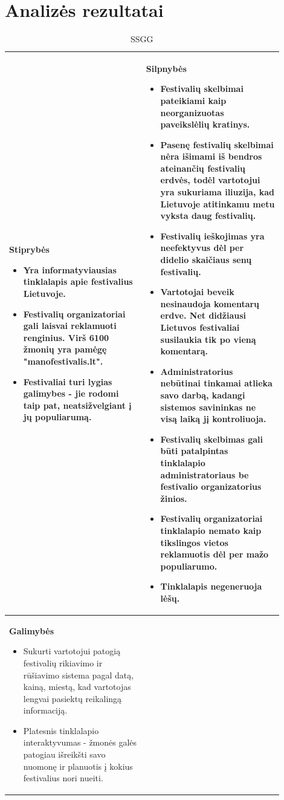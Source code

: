 \documentclass{VUMIFPSkursinis}
\begin{document}
\section{Analizės rezultatai}
\begin{longtable}{|p{0.45\linewidth}|p{0.45\linewidth}|} 
  \caption{SSGG}\\
  \hline
  \textbf{Stiprybės}
  \begin{itemize}
	\item Yra informatyviausias tinklalapis apie festivalius Lietuvoje.
	\item Festivalių organizatoriai gali laisvai reklamuoti renginius. Virš 6100 žmonių yra pamėgę "manofestivalis.lt".
	\item Festivaliai turi lygias galimybes - jie rodomi taip pat, neatsižvelgiant į jų populiarumą.
  \end{itemize}
  &
  \textbf{Silpnybės}
  \begin{itemize}
	\item Festivalių skelbimai pateikiami kaip neorganizuotas paveikslėlių kratinys.
	\item Pasenę festivalių skelbimai nėra išimami iš bendros ateinančių festivalių erdvės, todėl vartotojui yra sukuriama iliuzija, kad Lietuvoje atitinkamu metu vyksta daug festivalių.
	\item Festivalių ieškojimas yra neefektyvus dėl per didelio skaičiaus senų festivalių.
	\item Vartotojai beveik nesinaudoja komentarų erdve. Net didžiausi Lietuvos festivaliai susilaukia tik po vieną komentarą.
	\item Administratorius nebūtinai tinkamai atlieka savo darbą, kadangi sistemos savininkas ne visą laiką jį kontroliuoja.
	\item Festivalių skelbimas gali būti patalpintas tinklalapio administratoriaus be festivalio organizatorius žinios.
	\item Festivalių organizatoriai tinklalapio nemato kaip tikslingos vietos reklamuotis dėl per mažo populiarumo.
	\item Tinklalapis negeneruoja lėšų.
  \end{itemize}\\
  \hline
  \textbf{Galimybės}
  \begin{itemize}
	\item Sukurti vartotojui patogią festivalių rikiavimo ir rūšiavimo sistema pagal datą, kainą, miestą, kad vartotojas lengvai pasiektų reikalingą informaciją.
	\item Platesnis tinklalapio interaktyvumas - žmonės galės patogiau išreikšti savo nuomonę ir planuotis į kokius festivalius nori nueiti.

\end{itemize}
\end{longtable}
\end{document}
